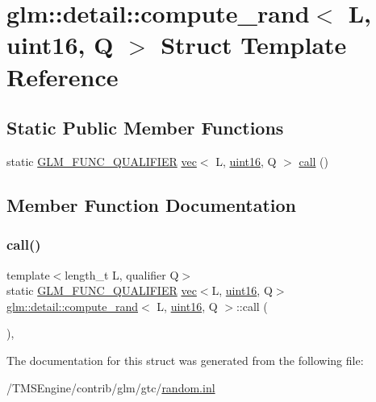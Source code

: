 \hypertarget{structglm_1_1detail_1_1compute__rand_3_01_l_00_01uint16_00_01_q_01_4}{}\section{glm\+:\+:detail\+:\+:compute\+\_\+rand$<$ L, uint16, Q $>$ Struct Template Reference}
\label{structglm_1_1detail_1_1compute__rand_3_01_l_00_01uint16_00_01_q_01_4}
\subsection*{Static Public Member Functions}
\begin{DoxyCompactItemize}
\item 
static \hyperlink{setup_8hpp_a33fdea6f91c5f834105f7415e2a64407}{G\+L\+M\+\_\+\+F\+U\+N\+C\+\_\+\+Q\+U\+A\+L\+I\+F\+I\+ER} \hyperlink{structglm_1_1vec}{vec}$<$ L, \hyperlink{namespaceglm_1_1detail_a47b2a7d006d187338e8031a352d1ce56}{uint16}, Q $>$ \hyperlink{structglm_1_1detail_1_1compute__rand_3_01_l_00_01uint16_00_01_q_01_4_a3fd5ddfdeccd559f68aecf1e8074d24b}{call} ()
\end{DoxyCompactItemize}


\subsection{Member Function Documentation}
\mbox{\label{structglm_1_1detail_1_1compute__rand_3_01_l_00_01uint16_00_01_q_01_4_a3fd5ddfdeccd559f68aecf1e8074d24b}} 
\subsubsection{\texorpdfstring{call()}{call()}}
{\footnotesize\ttfamily template$<$length\+\_\+t L, qualifier Q$>$ \\
static \hyperlink{setup_8hpp_a33fdea6f91c5f834105f7415e2a64407}{G\+L\+M\+\_\+\+F\+U\+N\+C\+\_\+\+Q\+U\+A\+L\+I\+F\+I\+ER} \hyperlink{structglm_1_1vec}{vec}$<$L, \hyperlink{namespaceglm_1_1detail_a47b2a7d006d187338e8031a352d1ce56}{uint16}, Q$>$ \hyperlink{structglm_1_1detail_1_1compute__rand}{glm\+::detail\+::compute\+\_\+rand}$<$ L, \hyperlink{namespaceglm_1_1detail_a47b2a7d006d187338e8031a352d1ce56}{uint16}, Q $>$\+::call (\begin{DoxyParamCaption}{ }\end{DoxyParamCaption})\hspace{0.3cm}{\ttfamily [inline]}, {\ttfamily [static]}}



The documentation for this struct was generated from the following file\+:\begin{DoxyCompactItemize}
\item 
/\+T\+M\+S\+Engine/contrib/glm/gtc/\hyperlink{random_8inl}{random.\+inl}\end{DoxyCompactItemize}
